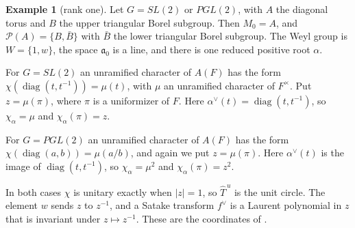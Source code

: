 \documentclass[12pt,letterpaper]{article}
\numberwithin{equation}{section}
\theoremstyle{plain}
\theoremstyle{definition}
\newtheorem{example}[theorem]{Example}
\theoremstyle{remark}
\newcommand{\cP}{\mathcal{P}}
\newcommand{\fa}{\mathfrak{a}}
\newcommand{\Thu}{\widehat{T}^{\,u}}
\DeclareMathOperator{\diag}{diag}
\begin{document}
\begin{example}[rank one]\label{ex:notation}
Let $G=SL(2)$ or $PGL(2)$, with $A$ the diagonal torus and $B$ the upper triangular Borel subgroup. Then $M_0=A$, and $\cP(A)=\{B,\bar B\}$ with $\bar B$ the lower triangular Borel subgroup. The Weyl group is $W=\{1,w\}$, the space $\fa_0$ is a line, and there is one reduced positive root $\alpha$.

For $G=SL(2)$ an unramified character of $A(F)$ has the form $\chi(\diag(t,t^{-1}))=\mu(t)$, with $\mu$ an unramified character of $F^\times$. Put $z=\mu(\pi)$, where $\pi$ is a uniformizer of $F$. Here $\alpha^\vee(t)=\diag(t,t^{-1})$, so $\chi_\alpha=\mu$ and $\chi_\alpha(\pi)=z$.

For $G=PGL(2)$ an unramified character of $A(F)$ has the form $\chi(\diag(a,b))=\mu(a/b)$, and again we put $z=\mu(\pi)$. Here $\alpha^\vee(t)$ is the image of $\diag(t,t^{-1})$, so $\chi_\alpha=\mu^2$ and $\chi_\alpha(\pi)=z^2$.

In both cases $\chi$ is unitary exactly when $|z|=1$, so $\Thu$ is the unit circle. The element $w$ sends $z$ to $z^{-1}$, and a Satake transform $f^\vee$ is a Laurent polynomial in $z$ that is invariant under $z\mapsto z^{-1}$. These are the coordinates of \cite[\S6.0]{JC26}.
\end{example}
\end{document}
